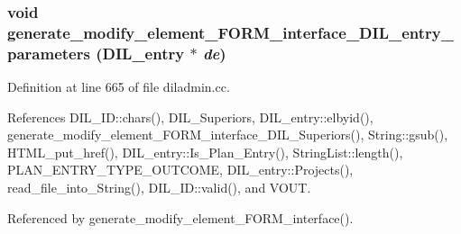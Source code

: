 \subsubsection{\setlength{\rightskip}{0pt plus 5cm}void generate\_\-modify\_\-element\_\-FORM\_\-interface\_\-DIL\_\-entry\_\-parameters ({\bf DIL\_\-entry} $\ast$ {\em de})}\label{diladmin_8cc_a9}




Definition at line 665 of file diladmin.cc.

References DIL\_\-ID::chars(), DIL\_\-Superiors, DIL\_\-entry::elbyid(), generate\_\-modify\_\-element\_\-FORM\_\-interface\_\-DIL\_\-Superiors(), String::gsub(), HTML\_\-put\_\-href(), DIL\_\-entry::Is\_\-Plan\_\-Entry(), String\-List::length(), PLAN\_\-ENTRY\_\-TYPE\_\-OUTCOME, DIL\_\-entry::Projects(), read\_\-file\_\-into\_\-String(), DIL\_\-ID::valid(), and VOUT.

Referenced by generate\_\-modify\_\-element\_\-FORM\_\-interface().



